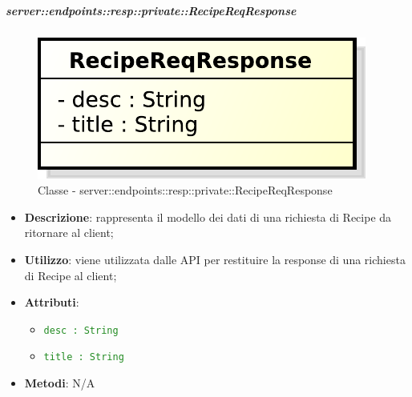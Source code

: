     \subparagraph{server::endpoints::resp::private::RecipeReqResponse} %
    \label{subp:bdsm_app_server_endpoints_resp_private_recipereqresponse}
  \begin{figure}[!htbp]
    \centering
    \centerline{\includegraphics[scale=0.6]{./images/server/classes/endpoints/recipe_req_response.pdf}}
    \caption{Classe - server::endpoints::resp::private::RecipeReqResponse}
  \end{figure}
    \begin{itemize}
      \item \textbf{Descrizione}: rappresenta il modello dei dati di una richiesta di Recipe da ritornare al client;
      \item \textbf{Utilizzo}: viene utilizzata dalle API per restituire la response di una richiesta di Recipe al client;
    \item \textbf{Attributi}:
      \begin{itemize}
        \item \textcolor{forestgreen}{\texttt{desc : String}}
        \item \textcolor{forestgreen}{\texttt{title : String}}
      \end{itemize}
    \item \textbf{Metodi}: N/A
      \end{itemize}

